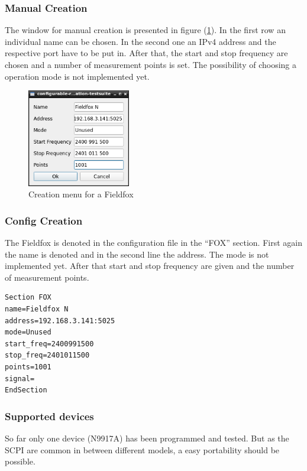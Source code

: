 \documentclass[10pt,a4paper]{article}
\begin{document}
	\subsubsection{Manual Creation}	
	
	The window for manual creation is presented in figure (\ref{f:fox_menu}). In the first row an individual name can be chosen. In the second one an IPv4 address and the respective port have to be put in. After that, the start and stop frequency are chosen and a number of measurement points is set. The possibility of choosing a operation mode is not implemented yet.
	
	\begin{figure}[H]
	\centering
	\includegraphics[width=0.4\textwidth]{./10_FOX_menu.png}
	\caption{Creation menu for a Fieldfox}
	\label{f:fox_menu}
	\end{figure}
	
	\subsubsection{Config Creation}	
	The Fieldfox is denoted in the configuration file in the \enquote{FOX} section. First again the name is denoted and in the second line the address. The mode is not implemented yet. After that start and stop frequency are given and the number of measurement points.
	
\begin{lstlisting}[caption=FOX Config]
Section FOX
name=Fieldfox N
address=192.168.3.141:5025
mode=Unused
start_freq=2400991500
stop_freq=2401011500
points=1001
signal=
EndSection
\end{lstlisting}
	
		\subsubsection{Supported devices}
		So far only one device (N9917A) has been programmed and tested. But as the SCPI are common in between different models, a easy portability should be possible.
	
\end{document}
